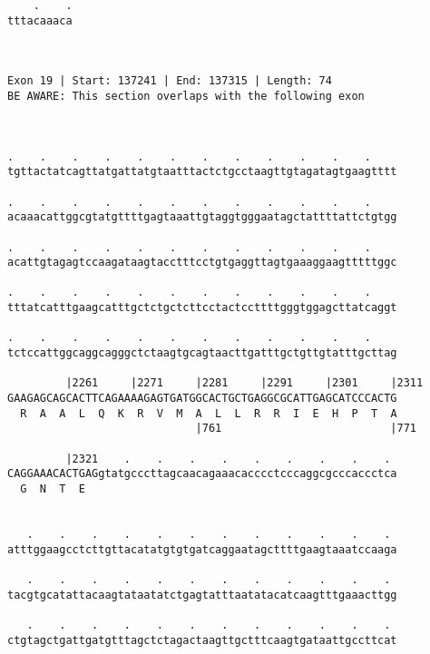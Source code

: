 \documentclass{article}
\begin{document}
\begin{Verbatim}
    .    .
tttacaaaca
          
          
 
Exon 19 | Start: 137241 | End: 137315 | Length: 74
BE AWARE: This section overlaps with the following exon



.    .    .    .    .    .    .    .    .    .    .    .    
tgttactatcagttatgattatgtaatttactctgcctaagttgtagatagtgaagtttt
                                                            
.    .    .    .    .    .    .    .    .    .    .    .    
acaaacattggcgtatgttttgagtaaattgtaggtgggaatagctattttattctgtgg
                                                            
.    .    .    .    .    .    .    .    .    .    .    .    
acattgtagagtccaagataagtacctttcctgtgaggttagtgaaaggaagtttttggc
                                                            
.    .    .    .    .    .    .    .    .    .    .    .    
tttatcatttgaagcatttgctctgctcttcctactccttttgggtggagcttatcaggt
                                                            
.    .    .    .    .    .    .    .    .    .    .    .    
tctccattggcaggcagggctctaagtgcagtaacttgatttgctgttgtatttgcttag
                                                            
         |2261     |2271     |2281     |2291     |2301     |2311
GAAGAGCAGCACTTCAGAAAAGAGTGATGGCACTGCTGAGGCGCATTGAGCATCCCACTG
  R  A  A  L  Q  K  R  V  M  A  L  L  R  R  I  E  H  P  T  A
                             |761                          |771
  
         |2321    .    .    .    .    .    .    .    .    . 
CAGGAAACACTGAGgtatgcccttagcaacagaaacacccctcccaggcgcccaccctca
  G  N  T  E                                                
                                                            
  
   .    .    .    .    .    .    .    .    .    .    .    . 
atttggaagcctcttgttacatatgtgtgatcaggaatagcttttgaagtaaatccaaga
                                                            
   .    .    .    .    .    .    .    .    .    .    .    . 
tacgtgcatattacaagtataatatctgagtatttaatatacatcaagtttgaaacttgg
                                                            
   .    .    .    .    .    .    .    .    .    .    .    . 
ctgtagctgattgatgtttagctctagactaagttgctttcaagtgataattgccttcat
                                                            

\end{Verbatim}
\end{document}
